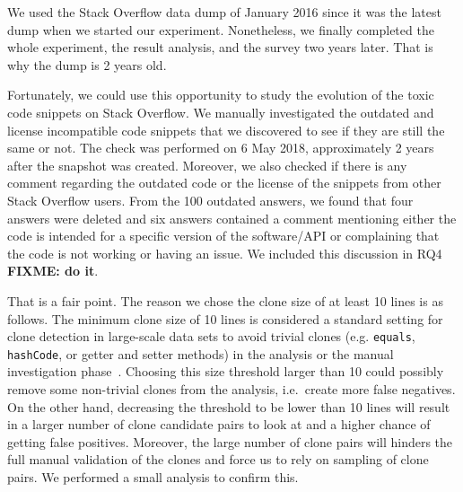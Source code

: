\documentclass[a4paper,twoside,10pt]{reviewresponse}
\newcommand\FIXME[1]{{\color{red}\textbf{FIXME: #1}}}
\begin{document}

We used the Stack Overflow data dump of January 2016 since it was the latest dump when we started our experiment. Nonetheless, we finally completed the whole experiment, the result analysis, and the survey two years later. That is why the dump is 2 years old.

Fortunately, we could use this opportunity to study the evolution of the toxic code snippets on Stack Overflow. We manually investigated the outdated and license incompatible code snippets that we discovered to see if they are still the same or not. The check was performed on 6 May 2018, approximately 2 years after the snapshot was created. Moreover, we also checked if there is any comment regarding the outdated code or the license of the snippets from other Stack Overflow users. From the 100 outdated answers, we found that four answers were deleted and six answers contained a comment mentioning either the code is intended for a specific version of the software/API or complaining that the code is not working or having an issue. 
We included this discussion in RQ4 \FIXME{do it}.


That is a fair point. The reason we chose the clone size of at least 10 lines is as follows. The minimum clone size of 10 lines is considered a standard setting for clone detection in large-scale data sets to avoid trivial clones (e.g. \texttt{equals}, \texttt{hashCode}, or getter and setter methods) in the analysis or the manual investigation phase~\citep{Sajnani2016}. 
Choosing this size threshold larger than 10 could possibly remove some non-trivial clones from the analysis, i.e.~create more false negatives.
On the other hand, decreasing the threshold to be lower than 10 lines will result in a larger number of clone candidate pairs to look at and a higher chance of getting false positives. Moreover, the large number of clone pairs will hinders the full manual validation of the clones and force us to rely on sampling of clone pairs. We performed a small analysis to confirm this.
\end{document}
